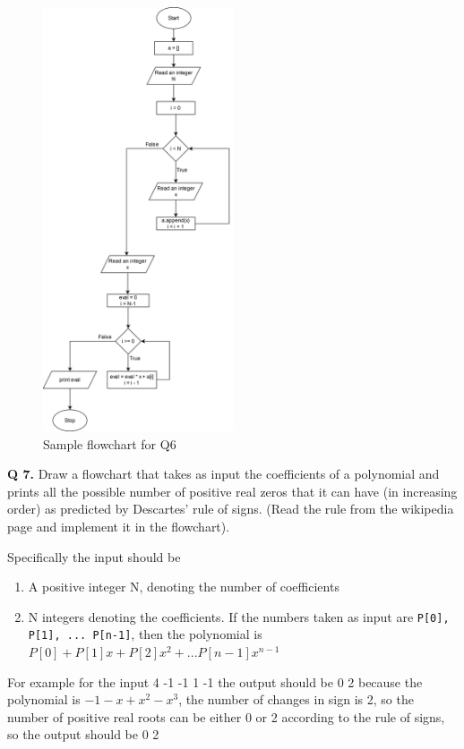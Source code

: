 \documentclass{article}
\begin{document}
\begin{figure}[ht]
    \centering
    \includegraphics[width=0.5\textwidth]{Q6.png}
    \caption{Sample flowchart for Q6}
    \label{Q6}
\end{figure}

\clearpage

\begin{flushleft}

    \textbf{Q 7. } Draw a flowchart that takes as input the coefficients of a polynomial and 
    prints all the possible number of positive real zeros that it can have (in increasing order) 
    as predicted by Descartes’ rule of signs. 
    (Read the rule from the wikipedia page and implement it in the flowchart).

    Specifically the input should be 
    \begin{enumerate}
        \item A positive integer N, denoting the number of coefficients
        \item N integers denoting the coefficients. 
        If the numbers taken as input are \lstinline{P[0], P[1], ... P[n-1]}, 
        then the polynomial is $P[0] + P[1] x + P[2] x^2 + ... P[n-1] x^{n-1}$
    \end{enumerate}
    
    For example for the input
        4
        -1 -1 1 -1
    the output should be
        0 2
    because the polynomial is $-1 -x + x^2-x^3$,
    the number of changes in sign is 2, so the number of positive real roots can be either 0 or 2 according to the rule of signs, so the output should be 
        0 2
    \end{flushleft}
    
\end{document}
